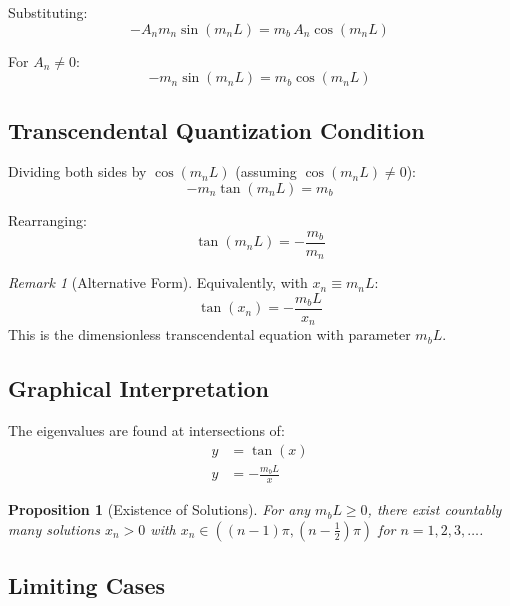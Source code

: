 \documentclass[11pt,a4paper]{article}
\newcommand{\mb}{m_b}
\theoremstyle{definition}
\theoremstyle{plain}
\newtheorem{proposition}{Proposition}[section]
\theoremstyle{remark}
\newtheorem{remark}{Remark}[section]
\begin{document}
Substituting:
\begin{equation}
-A_n m_n\sin(m_n L) = \mb\, A_n\cos(m_n L)
\label{eq:robin-substituted}
\end{equation}

For $A_n \neq 0$:
\begin{equation}
-m_n\sin(m_n L) = \mb\cos(m_n L)
\label{eq:robin-simplified}
\end{equation}

\subsection{Transcendental Quantization Condition}

Dividing both sides by $\cos(m_n L)$ (assuming $\cos(m_n L) \neq 0$):
\begin{equation}
-m_n\tan(m_n L) = \mb
\label{eq:tan-form-1}
\end{equation}

Rearranging:
\begin{equation}
\boxed{\tan(m_n L) = -\frac{\mb}{m_n}}
\label{eq:transcendental}
\end{equation}

\begin{remark}[Alternative Form]
Equivalently, with $x_n \equiv m_n L$:
\begin{equation}
\tan(x_n) = -\frac{\mb L}{x_n}
\label{eq:transcendental-x}
\end{equation}
This is the dimensionless transcendental equation with parameter $\mb L$.
\end{remark}

\subsection{Graphical Interpretation}

The eigenvalues are found at intersections of:
\begin{align}
y &= \tan(x) \label{eq:curve1} \\
y &= -\frac{\mb L}{x} \label{eq:curve2}
\end{align}

\begin{proposition}[Existence of Solutions]
For any $\mb L \geq 0$, there exist countably many solutions $x_n > 0$
with $x_n \in ((n-1)\pi, (n-\tfrac{1}{2})\pi)$ for $n = 1, 2, 3, \ldots$.
\end{proposition}

\subsection{Limiting Cases}
\end{document}
